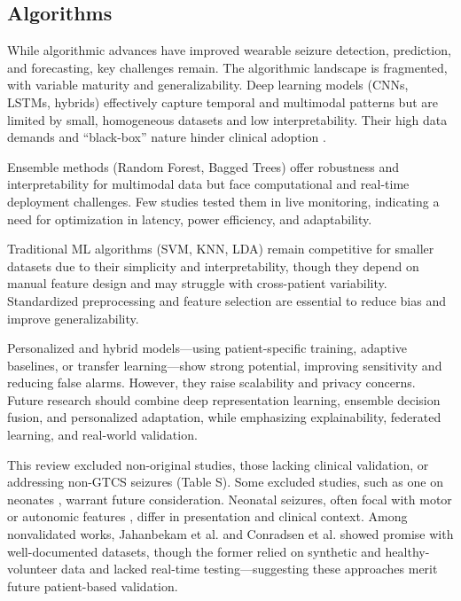 \subsection{Algorithms}
While algorithmic advances have improved wearable seizure detection, prediction, and forecasting, key challenges remain. The algorithmic landscape is fragmented, with variable maturity and generalizability. Deep learning models (CNNs, LSTMs, hybrids) effectively capture temporal and multimodal patterns but are limited by small, homogeneous datasets and low interpretability. Their high data demands and “black-box” nature hinder clinical adoption \cite{Kumar2023-yb}.

Ensemble methods (Random Forest, Bagged Trees) offer robustness and interpretability for multimodal data but face computational and real-time deployment challenges. Few studies tested them in live monitoring, indicating a need for optimization in latency, power efficiency, and adaptability.

Traditional ML algorithms (SVM, KNN, LDA) remain competitive for smaller datasets due to their simplicity and interpretability, though they depend on manual feature design and may struggle with cross-patient variability. Standardized preprocessing and feature selection are essential to reduce bias and improve generalizability.

Personalized and hybrid models—using patient-specific training, adaptive baselines, or transfer learning—show strong potential, improving sensitivity and reducing false alarms. However, they raise scalability and privacy concerns. Future research should combine deep representation learning, ensemble decision fusion, and personalized adaptation, while emphasizing explainability, federated learning, and real-world validation.

This review excluded non-original studies, those lacking clinical validation, or addressing non-GTCS seizures (Table S). Some excluded studies, such as one on neonates \cite{Chen2023-ns}, warrant future consideration. Neonatal seizures, often focal with motor or autonomic features \cite{Ziobro24-neo}, differ in presentation and clinical context. Among nonvalidated works, Jahanbekam et al. \cite{Jahanbekam2021-fh} and Conradsen et al. \cite{Conradsen2010-ut} showed promise with well-documented datasets, though the former relied on synthetic and healthy-volunteer data and lacked real-time testing—suggesting these approaches merit future patient-based validation.